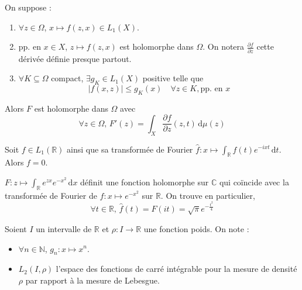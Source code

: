 
	\begin{theorem}
		On suppose :
		\begin{enumerate}[label=(\roman*)]
			\item $\forall z \in \Omega$, $x \mapsto f(z,x) \in L_1(X)$.
			\item pp. en $x \in X$, $z \mapsto f(z,x)$ est holomorphe dans $\Omega$. On notera $\frac{\partial f}{\partial z}$ cette dérivée définie presque partout.
			\item $\forall K \subseteq \Omega$ compact, $\exists g_K \in L_1(X)$ positive telle que
			\[ \left| f(x,z) \right| \leq g_K(x) \quad \forall z \in K, \text{pp. en } x \]
		\end{enumerate}
		Alors $F$ est holomorphe dans $\Omega$ avec
		\[ \forall z \in \Omega, \, F'(z) = \int_X \frac{\partial f}{\partial z}(z, t) \, \mathrm{d}\mu(z) \]
	\end{theorem}


	\begin{application}
		Soit $f \in L_1(\mathbb{R})$ ainsi que sa transformée de Fourier $\widehat{f} : x \mapsto \int_{\mathbb{R}} f(t) e^{-ixt} \, \mathrm{d}t$. Alors $f = 0$.
	\end{application}


	\begin{application}
		$F : z \mapsto \int_{\mathbb{R}} e^{zx} e^{-x^2} \, \mathrm{d}x$ définit une fonction holomorphe sur $\mathbb{C}$ qui coïncide avec la transformée de Fourier de $f : x \mapsto e^{-x^2}$ sur $\mathbb{R}$. On trouve en particulier,
		\[ \forall t \in \mathbb{R}, \, \widehat{f}(t) = F(it) = \sqrt{\pi} e^{-\frac{t^2}{4}} \]
	\end{application}


	\begin{notation}
		Soient $I$ un intervalle de $\mathbb{R}$ et $\rho : I \rightarrow \mathbb{R}$ une fonction poids. On note :
		\begin{itemize}
			\item $\forall n \in \mathbb{N}$, $g_n : x \mapsto x^n$.
			\item $L_2(I, \rho)$ l'espace des fonctions de carré intégrable pour la mesure de densité $\rho$ par rapport à la mesure de Lebesgue.
		\end{itemize}
	\end{notation}

